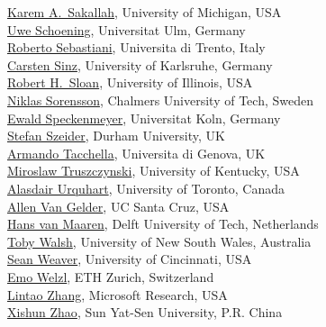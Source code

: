 \documentclass[10pt]{article}
\begin{document}
\begin{minipage}[t]{7.5cm}
{          \href{http://www.eecs.umich.edu/~karem/}{Karem A.\ Sakallah}, University of Michigan, USA  \\
          \href{http://theorie.informatik.uni-ulm.de/Personen/Schoening/index.html}{Uwe Schoening}, Universitat Ulm, Germany   \\
          \href{http://www.dit.unitn.it/~rseba/}{Roberto Sebastiani}, Universita di Trento, Italy  \\
          \href{http://www.carstensinz.de/}{Carsten Sinz}, University of Karlsruhe, Germany \\
          \href{http://www.cs.uic.edu/~sloan/}{Robert H.\ Sloan}, University of Illinois, USA  \\
          \href{http://www.cs.chalmers.se/~nik/}{Niklas Sorensson}, Chalmers University of Tech, Sweden  \\
          \href{http://www.scale.uni-koeln.de/}{Ewald Speckenmeyer}, Universitat Koln, Germany  \\
          \href{http://www.dur.ac.uk/stefan.szeider/}{Stefan Szeider}, Durham University, UK  \\
          \href{http://www.mrg.dist.unige.it/~tac/}{Armando Tacchella}, Universita di Genova, UK  \\
          \href{http://www.cs.uky.edu/~mirek/}{Miroslaw Truszczynski}, University of Kentucky, USA  \\
          \href{http://www.philosophy.utoronto.ca/people/~aurquhart}{Alasdair Urquhart}, University of Toronto, Canada\\
          \href{http://www.soe.ucsc.edu/~avg/}{Allen Van Gelder}, UC Santa Cruz, USA  \\
          \href{http://www.st.ewi.tudelft.nl/~maaren/}{Hans van Maaren},  Delft University of Tech, Netherlands  \\
          \href{http://www.cse.unsw.edu.au/~tw/}{Toby Walsh}, University of New South Wales, Australia  \\
          \href{http://www.cs.uc.edu/~weaversa/}{Sean Weaver}, University of Cincinnati, USA  \\
          \href{http://www.inf.ethz.ch/personal/emo/}{Emo Welzl}, ETH Zurich, Switzerland  \\
          \href{http://research.microsoft.com/users/lintaoz/}{Lintao Zhang}, Microsoft Research, USA  \\
          \href{http://logic.sysu.edu.cn/2005/english/PEOPLE/200510/english_277.html}{Xishun Zhao}, Sun Yat-Sen University, P.R. China  \\
}
\end{minipage}
\end{document}
